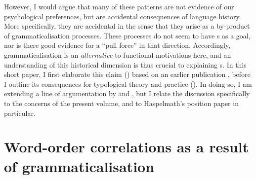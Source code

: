 \documentclass[output=paper]{langsci/langscibook}
\begin{document}
However, I would argue that many of these patterns are not evidence of our psychological preferences, but are accidental consequences of language history. More specifically, they are accidental in the sense that they arise as a by-product of grammaticalisation processes. These processes do not seem to have s as a goal, nor is there good evidence for a “pull force” in that direction. Accordingly, grammaticalisation is an \textit{alternative} to functional motivations here, and an understanding of this historical dimension is thus crucial to explaining s. In this short paper, I first elaborate this claim () based on an earlier publication \citep{Collins2012}, before I outline its consequences for typological theory and practice (). In doing so, I am extending a line of argumentation by \citet{Givón1971} and \citet{Aristar1991}, but I relate the discussion specifically to the concerns of the present volume, and to Haspelmath’s position paper in particular.

\section{Word-order correlations as a result of grammaticalisation}\label{sec:collins:2}
\end{document}
